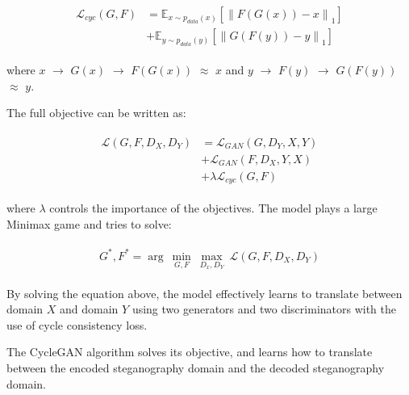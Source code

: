 \documentclass[conference]{IEEEtran}
\begin{document}
\begin{align}
    \begin{split}
        \mathcal{L}_{cyc}(G, F) &= \mathbb{E}_{x \sim p_{data}(x)}[{\lVert F(G(x)) - x \rVert}_1] \\
        &+ \mathbb{E}_{y \sim p_{data}(y)}[{\lVert G(F(y)) - y \rVert}_1]
    \end{split}
\end{align}

where $x$ $\rightarrow$ $G(x)$ $\rightarrow$ $F(G(x))$ $\approx$ $x$ and $y$ $\rightarrow$ $F(y)$ $\rightarrow$ $G(F(y))$ $\approx$ $y$.

The full objective can be written as:

\begin{align}
    \begin{split}
        \mathcal{L}(G,F,D_X,D_Y) &= \mathcal{L}_{GAN}(G,D_Y,X,Y) \\
        &+ \mathcal{L}_{GAN}(F,D_X,Y,X) \\
        &+ \lambda \mathcal{L}_{cyc}(G,F)
    \end{split}
\end{align}

where $\lambda$ controls the importance of the objectives. The model plays a large Minimax game and tries to solve:

\begin{align}
    \begin{split}
        G^*, F^* = {\arg}\:\underset{G, F}{\min}\:\underset{D_x, D_Y}{\max}\:\mathcal{L}(G,F,D_X,D_Y)
    \end{split}
\end{align}

By solving the equation above, the model effectively learns to translate between domain $X$ and domain $Y$ using two generators and two discriminators with the use of cycle consistency loss. 

The CycleGAN algorithm solves its objective, and learns how to translate between the encoded steganography domain and the decoded steganography domain. 
\end{document}
